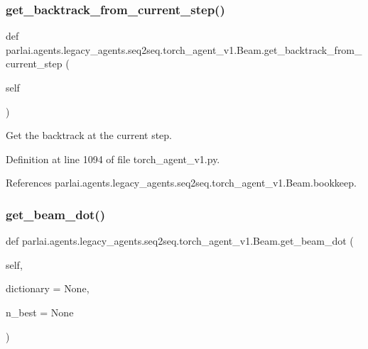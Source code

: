 \subsubsection{\texorpdfstring{get\+\_\+backtrack\+\_\+from\+\_\+current\+\_\+step()}{get\_backtrack\_from\_current\_step()}}
{\footnotesize\ttfamily def parlai.\+agents.\+legacy\+\_\+agents.\+seq2seq.\+torch\+\_\+agent\+\_\+v1.\+Beam.\+get\+\_\+backtrack\+\_\+from\+\_\+current\+\_\+step (\begin{DoxyParamCaption}\item[{}]{self }\end{DoxyParamCaption})}

\begin{DoxyVerb}Get the backtrack at the current step.\end{DoxyVerb}
 

Definition at line 1094 of file torch\+\_\+agent\+\_\+v1.\+py.



References parlai.\+agents.\+legacy\+\_\+agents.\+seq2seq.\+torch\+\_\+agent\+\_\+v1.\+Beam.\+bookkeep.

\mbox{\label{classparlai_1_1agents_1_1legacy__agents_1_1seq2seq_1_1torch__agent__v1_1_1Beam_af4d7c9fd1fd93f59148fe7ab90c58da9}} 
\subsubsection{\texorpdfstring{get\+\_\+beam\+\_\+dot()}{get\_beam\_dot()}}
{\footnotesize\ttfamily def parlai.\+agents.\+legacy\+\_\+agents.\+seq2seq.\+torch\+\_\+agent\+\_\+v1.\+Beam.\+get\+\_\+beam\+\_\+dot (\begin{DoxyParamCaption}\item[{}]{self,  }\item[{}]{dictionary = {\ttfamily None},  }\item[{}]{n\+\_\+best = {\ttfamily None} }\end{DoxyParamCaption})}

